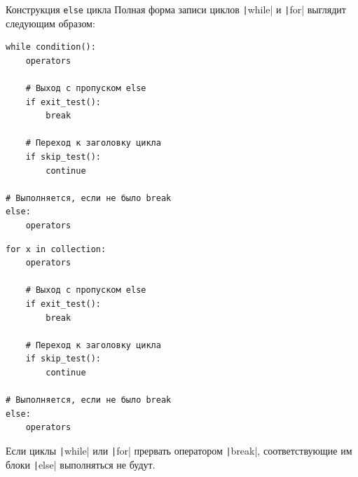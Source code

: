 \documentclass[aspectratio=169, mathserif]{beamer}	%
\begin{document}
%		
%
%


\begin{frame}[fragile]{Конструкция \texttt{else} цикла}
\scriptsize
Полная форма записи циклов \texttt|while| и \texttt|for| выглядит следующим образом:

\begin{multicols}{2}

\begin{verbatim}
while condition():
    operators

    # Выход с пропуском else
    if exit_test():
        break 

    # Переход к заголовку цикла
    if skip_test():
        continue

# Выполняется, если не было break
else:
    operators
\end{verbatim}

\columnbreak

\begin{verbatim}
for x in collection:
    operators

    # Выход с пропуском else
    if exit_test():
        break 

    # Переход к заголовку цикла
    if skip_test():
        continue

# Выполняется, если не было break
else:
    operators
\end{verbatim}

\end{multicols}	

Если циклы \texttt|while| или \texttt|for| прервать оператором \texttt|break|, соответствующие им блоки \texttt|else| выполняться не будут.
\vfill
\end{frame}
\end{document}
